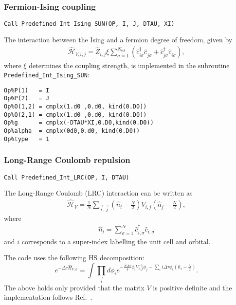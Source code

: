 \subsubsection{Fermion-Ising coupling}

\begin{lstlisting}[style=fortran]
Call Predefined_Int_Ising_SUN(OP, I, J, DTAU, XI)
\end{lstlisting}

The interaction between the Ising and a fermion degree of freedom, given by
\begin{align}
\hat{\mathcal{H}}_{V,i,j} =
\hat{Z}_{i,j} \xi  \sum_{\sigma=1}^{N_\mathrm{col}}\left( \hat{c}^{\dagger}_{i \sigma} \hat{c}^{\phantom\dagger}_{j \sigma} + \hat{c}^{\dagger}_{j \sigma} \hat{c}^{\phantom\dagger}_{i \sigma} \right),
\end{align} 
where $\xi$ determines the coupling strength, is implemented in the subroutine \texttt{Predefined\_Int\_Ising\_SUN}:
\begin{lstlisting}[style=fortran]
Op%P(1)   = I
Op%P(2)   = J
Op%O(1,2) = cmplx(1.d0 ,0.d0, kind(0.D0)) 
Op%O(2,1) = cmplx(1.d0 ,0.d0, kind(0.D0)) 
Op%g      = cmplx(-DTAU*XI,0.D0,kind(0.D0))
Op%alpha  = cmplx(0d0,0.d0, kind(0.D0)) 
Op%type   = 1

\end{lstlisting}



\subsubsection{Long-Range Coulomb repulsion}

\begin{lstlisting}[style=fortran]
Call Predefined_Int_LRC(OP, I, DTAU)
\end{lstlisting}

The Long-Range Coulomb (LRC) interaction can be written as
\begin{align}
\hat{\mathcal{H}}_{V} =
\frac{1} { N } \sum_{\vec{i},\vec{j}}  \left(  \hat{n}_{i} -  \frac{N}{2}  \right)  V_{i,j} \left(  \hat{n}_{j} -  \frac{N}{2}  \right), 
\end{align} 
where
\begin{align}
\hat{n}_{i} = \sum_{\sigma=1}^{N}  \hat{c}^{\dagger}_{i,\sigma}  \hat{c}^{}_{i,\sigma}
\end{align} 
and  $i$ corresponds to a super-index labelling  the unit cell and orbital. 


  The code uses the following  HS decomposition:
\begin{equation}
e^{-\Delta \tau \hat{H}_{V,k} }  =  \int \prod_{\vec{i}} d \phi_{i}   e^{ - \frac{N \Delta \tau} {4} \phi_{i} V^{-1}_{i,j}  \phi_{j} - \sum_{i}  i \Delta \tau \phi_i \left( \hat{n}_{i} - \frac{N}{2} \right) }.
\end{equation}
The above holds only provided that the matrix $V$ is positive definite and the implementation follows Ref.~\cite{Hohenadler14}.   

